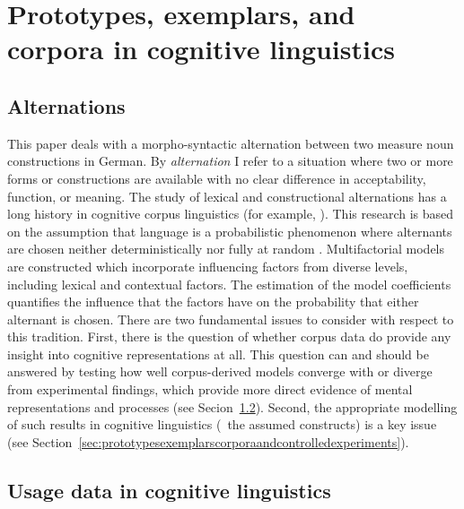 \section{Prototypes, exemplars, and corpora in cognitive linguistics}
\label{sec:cogocl}

\subsection{Alternations}
\label{sec:alternations}

This paper deals with a morpho-syntactic alternation between two measure noun constructions in German.
By \textit{alternation} I refer to a situation where two or more forms or constructions are available with no clear difference in acceptability, function, or meaning.
The study of lexical and constructional alternations has a long history in cognitive corpus linguistics (for example, \citealp{BresnanEa2007,BresnanHay2010,BresnanFord2010,DivjakArppe2013,Gries2015,NessetJanda2010}).
This research is based on the assumption that language is a probabilistic phenomenon where alternants are chosen neither deterministically nor fully at random \citep{Bresnan2007}.
Multifactorial models are constructed which incorporate influencing factors from diverse levels, including lexical and contextual factors.
The estimation of the model coefficients quantifies the influence that the factors have on the probability that either alternant is chosen.
There are two fundamental issues to consider with respect to this tradition.
First, there is the question of whether corpus data do provide any insight into cognitive representations at all.
This question can and should be answered by testing how well corpus-derived models converge with or diverge from experimental findings, which provide more direct evidence of mental representations and processes (see Secion~\ref{sec:usagedataincognitivelinguistics}).
Second, the appropriate modelling of such results in cognitive linguistics (\ie\ the assumed constructs) is a key issue (see Section~\ref{sec:prototypesexemplarscorporaandcontrolledexperiments}).

\subsection{Usage data in cognitive linguistics}
\label{sec:usagedataincognitivelinguistics}


